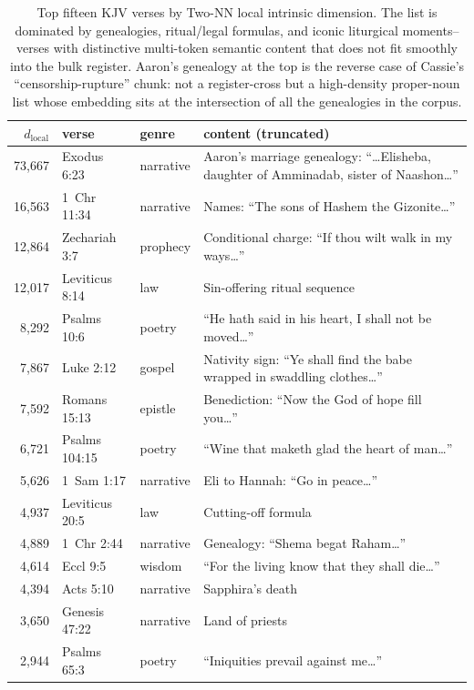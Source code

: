 \documentclass[11pt,a4paper]{article}
\theoremstyle{definition}
\newcommand{\dlocal}{d_{\mathrm{local}}}
\begin{document}
\begin{table}[H]
\centering
\small
\begin{tabular}{r l l p{6.5cm}}
\toprule
$\dlocal$ & verse & genre & content (truncated) \\
\midrule
73{,}667 & Exodus 6:23      & narrative & Aaron's marriage genealogy: ``\dots Elisheba, daughter of Amminadab, sister of Naashon\dots'' \\
16{,}563 & 1~Chr 11:34       & narrative & Names: ``The sons of Hashem the Gizonite\dots'' \\
12{,}864 & Zechariah 3:7    & prophecy  & Conditional charge: ``If thou wilt walk in my ways\dots'' \\
12{,}017 & Leviticus 8:14   & law       & Sin-offering ritual sequence \\
 8{,}292 & Psalms 10:6      & poetry    & ``He hath said in his heart, I shall not be moved\dots'' \\
 7{,}867 & Luke 2:12        & gospel    & Nativity sign: ``Ye shall find the babe wrapped in swaddling clothes\dots'' \\
 7{,}592 & Romans 15:13     & epistle   & Benediction: ``Now the God of hope fill you\dots'' \\
 6{,}721 & Psalms 104:15    & poetry    & ``Wine that maketh glad the heart of man\dots'' \\
 5{,}626 & 1~Sam 1:17        & narrative & Eli to Hannah: ``Go in peace\dots'' \\
 4{,}937 & Leviticus 20:5   & law       & Cutting-off formula \\
 4{,}889 & 1~Chr 2:44        & narrative & Genealogy: ``Shema begat Raham\dots'' \\
 4{,}614 & Eccl 9:5         & wisdom    & ``For the living know that they shall die\dots'' \\
 4{,}394 & Acts 5:10        & narrative & Sapphira's death \\
 3{,}650 & Genesis 47:22    & narrative & Land of priests \\
 2{,}944 & Psalms 65:3      & poetry    & ``Iniquities prevail against me\dots'' \\
\bottomrule
\end{tabular}
\caption{Top fifteen KJV verses by Two-NN local intrinsic dimension.
The list is dominated by genealogies, ritual/legal formulas, and iconic
liturgical moments--verses with distinctive multi-token semantic
content that does not fit smoothly into the bulk register. Aaron's
genealogy at the top is the reverse case of Cassie's
``censorship-rupture'' chunk: not a register-cross but a high-density
proper-noun list whose embedding sits at the intersection of all the
genealogies in the corpus.}
\label{tab:kjv-tail}
\end{table}
\end{document}
